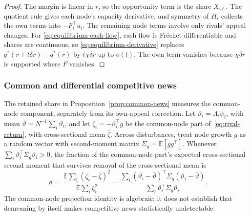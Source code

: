 \begin{proof}
  The margin is linear in $r$, so the opportunity term is the share $X_{i\ell}$.
  The quotient rule gives each node's capacity derivative, and symmetry of $H_i$
  collects the own terms into $-F_i^\top u_i$.
  The remaining node terms involve only rivals' appeal changes.
  For \eqref{eq:equilibrium-cash-flow}, cash flow is Fréchet differentiable and
  shares are continuous, so \eqref{eq:equilibrium-derivative} replaces
  $q^*(r+t\delta r)-q^*(r)$ by $t\chi\delta r$ up to $o(t)$.
  The own term vanishes because $\chi\delta r$ is supported where $F$ vanishes.
\end{proof}

\subsubsection{Common and differential competitive news}\label{app:common-news}

The retained share in Proposition~\ref{prop:common-news} measures the
common-node component, separately from its own-appeal correction.
Let $\vartheta_i=\Lambda_i\psi_i$, with mean
$\bar\vartheta=N^{-1}\sum_i\vartheta_i$, and let $\zeta_i=-\vartheta_i^\top g$ be
the common-node part of~\eqref{eq:rival-return}, with cross-sectional mean
$\bar\zeta$.
Across disturbances, treat node growth $g$ as a random vector with
second-moment matrix $\Sigma_g=\mathbb E[gg^\top]$.
Whenever $\sum_i\vartheta_i^\top\Sigma_g\vartheta_i>0$, the fraction of the
common-node part's expected cross-sectional second moment that survives
removal of the cross-sectional mean is
\begin{equation}\label{eq:retained-share}
  \varrho=\frac{\mathbb E\sum_i(\zeta_i-\bar\zeta)^2}{\mathbb E\sum_i\zeta_i^2}
  =\frac{\sum_i(\vartheta_i-\bar\vartheta)^\top\Sigma_g(\vartheta_i-\bar\vartheta)}
  {\sum_i\vartheta_i^\top\Sigma_g\vartheta_i}.
\end{equation}
The common-node projection identity is algebraic; it does not establish
that demeaning by itself makes competitive news statistically undetectable.

